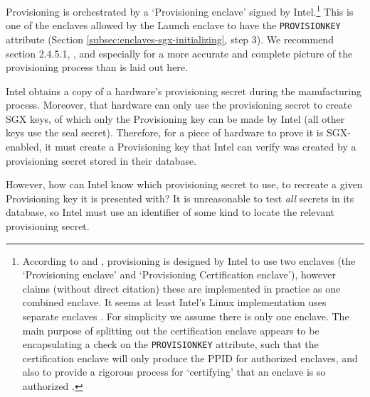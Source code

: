 
Provisioning is orchestrated by a `Provisioning enclave' signed by Intel.\footnote{According to \cite{sgx-extending-sgx-autonomy-and-anonymity-thesis} and \cite{sgx-remote-attestation-is-not-sufficient}, provisioning is designed by Intel to use two enclaves (the `Provisioning enclave' and `Provisioning Certification enclave'), however \cite{sgx-overview-part-2-externals-quarkslab} claims (without direct citation) these are implemented in practice as one combined enclave. It seems at least Intel's Linux implementation uses separate enclaves \cite{intel-lib-linux-sgx}. For simplicity we assume there is only one enclave. The main purpose of splitting out the certification enclave appears to be encapsulating a check on the {\tt PROVISIONKEY} attribute, such that the certification enclave will only produce the PPID for authorized enclaves, and also to provide a rigorous process for `certifying' that an enclave is so authorized \cite{intel-lib-linux-sgx}.} This is one of the enclaves allowed by the Launch enclave to have the {\tt PROVISIONKEY} attribute (Section \ref{subsec:enclaves-sgx-initializing}, step 3). We recommend \cite{sgx-extending-sgx-autonomy-and-anonymity-thesis} section 2.4.5.1, \cite{sgx-remote-attestation-is-not-sufficient}, and especially \cite{intel-lib-linux-sgx} for a more accurate and complete picture of the provisioning process than is laid out here.%

Intel obtains a copy of a hardware's provisioning secret during the manufacturing process. Moreover, that hardware can only use the provisioning secret to create SGX keys, of which only the Provisioning key can be made by Intel (all other keys use the seal secret). Therefore, for a piece of hardware to prove it is SGX-enabled, it must create a Provisioning key that Intel can verify was created by a provisioning secret stored in their database.

However, how can Intel know which provisioning secret to use, to recreate a given Provisioning key it is presented with? It is unreasonable to test {\em all} secrets in its database, so Intel must use an identifier of some kind to locate the relevant provisioning secret.

